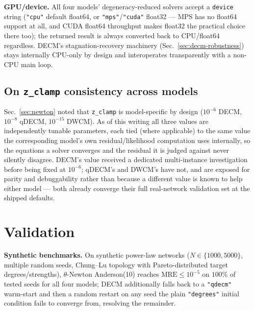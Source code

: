\documentclass[10pt]{article}
\begin{document}
\textbf{GPU/device.} All four models' degeneracy-reduced solvers accept a
\texttt{device} string (\texttt{"cpu"} default float64, or
\texttt{"mps"}/\texttt{"cuda"} float32 --- MPS has no float64 support at
all, and CUDA float64 throughput makes float32 the practical choice
there too); the returned result is always converted back to CPU/float64
regardless. DECM's stagnation-recovery machinery
(Sec.~\ref{sec:decm-robustness}) stays internally CPU-only by design and
interoperates transparently with a non-CPU main loop.

\subsection{On \texttt{z\_clamp} consistency across models}
\label{sec:zclamp-note}

Sec.~\ref{sec:newton} noted that \texttt{z\_clamp} is model-specific by
design ($10^{-6}$ DECM, $10^{-8}$ qDECM, $10^{-15}$ DWCM). As of this
writing all three values are independently tunable parameters, each tied
(where applicable) to the same value the corresponding model's own
residual/likelihood computation uses internally, so the equations a solver
converges and the residual it is judged against never silently disagree.
DECM's value received a dedicated multi-instance investigation before
being fixed at $10^{-6}$; qDECM's and DWCM's have not, and are exposed
for parity and debuggability rather than because a different value is
known to help either model --- both already converge their full real-network
validation set at the shipped defaults.

\section{Validation}
\label{sec:validation}

\textbf{Synthetic benchmarks.} On synthetic power-law networks
($N\in\{1000,5000\}$, multiple random seeds, Chung--Lu topology with
Pareto-distributed target degrees/strengths), $\theta$-Newton
Anderson(10) reaches $\mathrm{MRE}\le10^{-5}$ on $100\%$ of tested seeds
for all four models; DECM additionally falls back to a \texttt{"qdecm"}
warm-start and then a random restart on any seed the plain
\texttt{"degrees"} initial condition fails to converge from, resolving the
remainder.
\end{document}

